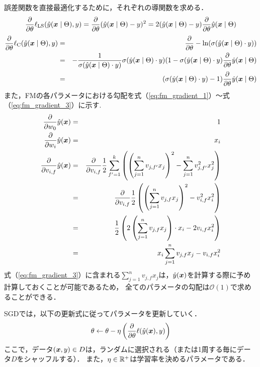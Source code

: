 誤差関数を直接最適化するために，それぞれの導関数を求める．
\begin{equation}
  \frac{\partial}{\partial \theta} \ell_{\rm LS}(\hat{y}(\mbox{\boldmath $x$} \mid \Theta), y)
  = \frac{\partial}{\partial \theta}(\hat{y}(\mbox{\boldmath $x$} \mid \Theta) - y)^{2}
  = 2(\hat{y}(\mbox{\boldmath $x$} \mid \Theta) - y)\frac{\partial}{\partial \theta}\hat{y}(\mbox{\boldmath $x$} \mid \Theta)
\end{equation}
\begin{eqnarray}
  \frac{\partial}{\partial \theta} \ell_{\rm C} (\hat{y}(\mbox{\boldmath $x$} \mid \Theta), y) &=& \frac{\partial}{\partial \theta} -\ln(\sigma(\hat{y}(\mbox{\boldmath $x$} \mid \Theta) \cdot y)) \nonumber \\
  &=& - \frac{1}{\sigma(\hat{y}(\mbox{\boldmath $x$} \mid \Theta) \cdot y)}\sigma(\hat{y}(\mbox{\boldmath $x$} \mid \Theta) \cdot y)(1-\sigma(\hat{y}(\mbox{\boldmath $x$} \mid \Theta) \cdot y)\frac{\partial}{\partial \theta}\hat{y}(\mbox{\boldmath $x$} \mid \Theta) \nonumber \\
  &=& (\sigma(\hat{y}(\mbox{\boldmath $x$} \mid \Theta) \cdot y) - 1)\frac{\partial}{\partial \theta}\hat{y}(\mbox{\boldmath $x$} \mid \Theta)
\end{eqnarray}
また，FMの各パラメータにおける勾配を式（\ref{eq:fm_gradient_1}）〜式（\ref{eq:fm_gradient_3}）に示す.
\begin{eqnarray}
  \frac{\partial}{\partial w_{0}} \hat{y}(\mbox{\boldmath $x$}) &=& 1 \label{eq:fm_gradient_1}\\
  \frac{\partial}{\partial w_{i}} \hat{y}(\mbox{\boldmath $x$}) &=& x_{i} \\
  \frac{\partial}{\partial v_{i,f}} \hat{y}(\mbox{\boldmath $x$}) &=& \frac{\partial}{\partial v_{i,f}} \frac{1}{2} \sum_{f'=1}^{k} \left ( \left ( \sum_{j=1}^{n} v_{j,f'}{x}_{j} \right )^{2}  - \sum_{j=1}^{n} v_{j,f'}^{2}{x}_{j}^{2} \right ) \nonumber \\
  &=& \frac{\partial}{\partial v_{i,f}} \frac{1}{2} \left ( \left ( \sum_{j=1}^{n} v_{j,f}{x}_{j} \right )^{2} - v_{i,f}^{2}{x}_{i}^{2} \right ) \nonumber \\
  &=& \frac{1}{2} \left ( 2 \left ( \sum_{j=1}^{n} v_{j,f}{x}_{j} \right ) \cdot x_{i} - 2 v_{i,f}{x}_{i}^{2} \right ) \nonumber \\
  &=& x_{i} \displaystyle \sum_{j=1}^{n} v_{j,f} x_{j} - v_{i,f} x_{i}^{2} \label{eq:fm_gradient_3}
\end{eqnarray}
式（\ref{eq:fm_gradient_3}）に含まれる$\sum_{j=1}^{n} v_{j,f} x_{j}$は，$\hat{y}(\mbox{\boldmath $x$})$を計算する際に予め計算しておくことが可能であるため，
全てのパラメータの勾配は$\mathcal{O}(1)$で求めることができる．

SGDでは，以下の更新式に従ってパラメータを更新していく．
\begin{equation}
  \theta \gets \theta - \eta \left ( \frac{\partial}{\partial \theta} \ell(\hat{y}(\mbox{\boldmath $x$}), y) \right )
\end{equation}
ここで，データ$(\mbox{\boldmath $x$}, y) \in D$は，ランダムに選択される（または1周する毎にデータ$D$をシャッフルする）．
また，$\eta \in \mathbb{R}^{+}$は学習率を決めるパラメータである．

